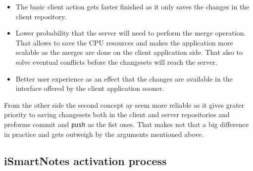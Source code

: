 \begin{itemize}
\item{The basic client action gets faster finished as it only saves the changes in the client repository.}
\item{Lower probability that the server will need to perform the merge operation. That allows to save the CPU resources and makes the application more scalable as the merges are done on the client application side. That also to solve eventual conflicts before the changesets will reach the server.}
\item{Better user experience as an effect that the changes are available in the interface offered by the client application sooner.}
\end{itemize}
From the other side the second concept ay seem more reliable as it gives grater priority to saving changesets both in the client and server repositories and preforms commit and \texttt{push} as the fist ones. That makes not that a big difference in practice and gets outweigh by the arguments mentioned above.




\subsection{iSmartNotes activation process}\label{subsec:ismartnotes_activation}
